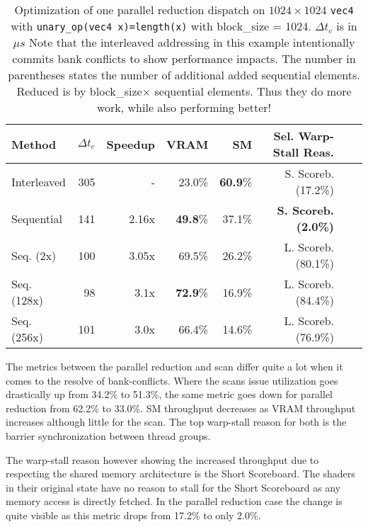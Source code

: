 \documentclass[m,times]{cgMA}
\begin{document}
\begin{table}[htpb]
  \begin{tabular}{ | l | r | r | r | r | r | r | r |}    \hline
    Method         &  $\Delta t_c$ & Speedup &VRAM              & SM              & Sel. Warp-Stall Reas.\\\hline
    Interleaved    & 305                   & -       &23.0\%          & \textbf{60.9}\%  & S. Scoreb.(17.2\%)\\\hline
    Sequential     & 141                   & 2.16x   &\textbf{49.8}\%   & 37.1\%         & \textbf{S. Scoreb.(2.0\%)} \\\hline
    Seq. (2x)      & 100                   & 3.05x   &69.5\%            & 26.2\%         & L. Scoreb.(80.1\%)\\\hline
    Seq. (128x)    & 98                    & 3.1x    &\textbf{72.9}\%   & 16.9\%         & L. Scoreb.(84.4\%)\\\hline
    Seq. (256x)    & 101                   & 3.0x    &66.4\%            & 14.6\%         & L. Scoreb.(76.9\%)\\
    \hline
  \end{tabular}
  \caption{Optimization of one parallel reduction dispatch on $1024\times1024$ \texttt{vec4} with \texttt{unary\_op(vec4 x)=length(x)} with block\_size = 1024. $\Delta t_c$ is in $\mu s$ Note that the interleaved addressing in this example intentionally commits bank conflicts to show performance impacts. The number in parentheses states the number of additional added sequential elements. Reduced is by block\_size$\times$ sequential elements. Thus they do more work, while also performing better!}\label{tab:map_reduce}
\end{table}

The metrics between the parallel reduction and scan differ quite a lot when it comes to the resolve of bank-conflicts. Where the scans issue utilization goes drastically up from 34.2\% to 51.3\%, the same metric goes down for parallel reduction from 62.2\% to 33.0\%. SM throughput decreases as VRAM throughput increases although little for the scan. The top warp-stall reason for both is the barrier synchronization between thread groups.

The warp-stall reason however showing the increased throughput due to respecting the shared memory architecture is the Short Scoreboard. The shaders in their original state have no reason to stall for the Short Scoreboard as any memory access is directly fetched. In the parallel reduction case the change is quite visible as this metric drops from 17.2\% to only 2.0\%.
\end{document}
